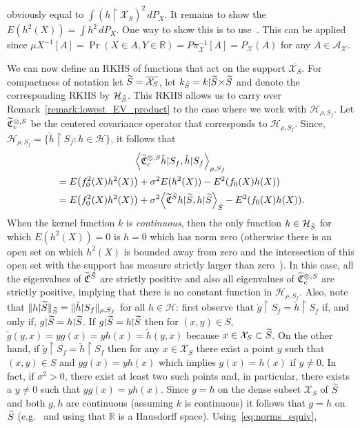 \documentclass[10pt]{amsart}
\theoremstyle{definition}\newtheorem{defi}[theo]{Definition}\newtheorem{rema}[theo]{Remark}\newtheorem{exam}[theo]{Example}\newtheorem{exem}[theo]{Example}\newtheorem{nota}[theo]{Notation}
\theoremstyle{remark}
\newcommand{\restrr}
{\!\!\upharpoonright\!\!}
\newcommand{\R}{\mathbb{R}}
\newcommand{\X}{\mathcal{X}}
\newcommand{\clA}{\mathcal{A}}
\newcommand{\cH}{\mathcal{H}}
\newcommand{\fkC}{\mathfrak{C}}
\newcommand{\Cov}{\tilde{\fkC}}
\let\oldtilde\tilde
\renewcommand*{\tilde}[1]{\mathchoice{\widetilde{#1}}{\widetilde{#1}}{\oldtilde{#1}}{\oldtilde{#1}}}
\let\originalleft\left
\let\originalright\right
\renewcommand{\left}{\mathopen{}\mathclose\bgroup\originalleft}
\renewcommand{\right}{\aftergroup\egroup\originalright}
\begin{document}
obviously equal to $\int (h\!\restrr\! \overline{\X_S})^2 \, dP_X$. It remains to show the $E(h^2(X)) = \int h^2 \, dP_X$. One way to show this is to use~\cite[235E]{FREM}. This can be applied since $\mu X^{-1}[A] = \Pr(X \in A, Y\in \R) = P \pi_\X^{-1}[A] = P_\X(A) $ for any $A\in \clA_\X$.

We can now define an RKHS of functions that act on the support $\overline{\X_S}$. For compactness of notation let $\tilde S = \overline{\X_S}$, let $k_{\tilde S} = k\restrr\tilde S \! \times \! \tilde S$ and denote the corresponding RKHS by $\cH_{\tilde S}$. This RKHS allows us to carry over Remark~\ref{remark:lowest_EV_product} to the case where we work with $\cH_{\rho,S_f}$. Let $\Cov^{\otimes,S}_c$ be the centered covariance operator that corresponds to $\cH_{\rho,S_f}$. Since, $\cH_{\rho,S_f} = \{ \check h \restrr S_f : h \in \cH\}$, it follows that
\begin{multline} \label{eq:cov_lbd_hcheck}
\left\langle \Cov^{\otimes,S}_c \check h \restrr S_f, \check h \restrr S_f \right\rangle_{\rho,S_f}\\
\begin{aligned}
&= E\left(f^2_0(X) h^2(X)\right) + \sigma^2 E(h^2(X)) - E^2(f_0(X) h(X)) \\
&= E\left(f_0^2(X) h^2(X)\right) + \sigma^2 \left\langle \Cov^{\tilde S} h \restrr \tilde S, h \restrr \tilde S \right\rangle_{\tilde S} - E^2(f_0(X) h(X)).
\end{aligned}
\end{multline}
When the kernel function $k$ is \emph{continuous}, then the only function $h \in \cH_{\tilde S}$ for which $E(h^2(X)) = 0$ is $h = 0$ which has norm zero (otherwise there is an open set on which $h^2(X)$ is bounded away from zero and the intersection of this open set with the support has measure strictly larger than zero~\cite[411N]{FREM}). In this case, all the eigenvalues of $\Cov^{\tilde S}$ are strictly positive and also all eigenvalues of $\Cov^{\otimes,S}_c$ are strictly positive, implying that there is no constant function in $\cH_{\rho,S_f}$. Also, note that $\|h \restrr \tilde S \|_{\tilde S} = \| \check h \restrr S_f \|_{\rho,S_f}$ for all $h \in \cH$: first observe that $\check g \restrr S_f = \check h \restrr S_f$ if, and only if, $g \restrr \tilde S = h \restrr \tilde S$. If $g \restrr \tilde S = h \restrr \tilde S$ then for $(x,y) \in S$, $\check g (y,x) = y g(x) = y h(x) = \check h(y,x)$ because $x\in \X_S \subset \tilde S$. On the other hand, if $\check g \restrr S_f = \check h \restrr S_f$ then for any $x \in \X_S$ there exist a point $y$ such that $(x,y) \in S$ and $y g(x) = y h(x)$ which implies $g(x) = h(x)$ if $y \not = 0$. In fact, if $\sigma^2 >0$, there exist at least two such points and, in particular, there exists a $y \not = 0$ such that $y g(x) = y h(x)$. Since $g=h$ on the dense subset $\X_S$ of $\tilde S$ and both $g,h$ are continuous (assuming $k$ is continuous) it follows that $g = h$ on $\tilde S$ (e.g.~\cite[Theorem~1.5.4]{ENG89} and using that $\R$ is a Hausdorff space). Using~\eqref{eq:norms_equiv},
\end{document}

